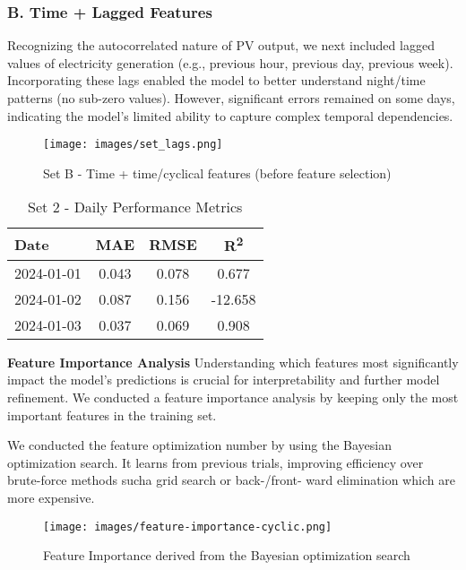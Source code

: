 \subsubsection*{B. Time + Lagged Features}
Recognizing the autocorrelated nature of PV output, we next included lagged values of 
electricity generation (e.g., previous hour, previous day, previous week). Incorporating 
these lags enabled the model to better understand night/time patterns (no sub-zero values).
However, significant errors remained on some days, indicating the model's limited ability 
to capture complex temporal dependencies.

\begin{figure}[H]
    \centering
    \texttt{[image: images/set\_lags.png]}
    \caption{Set B - Time + time/cyclical features (before feature selection)}
\end{figure}

\begin{table}[H]
    \centering
    \begin{tabular}{lccc}
        Date        & MAE    & RMSE   & R\textsuperscript{2} \\
        \hline
        2024-01-01  & 0.043  & 0.078  & 0.677 \\
        2024-01-02  & 0.087  & 0.156  & -12.658 \\
        2024-01-03  & 0.037  & 0.069  & 0.908 \\
    \end{tabular}
    \caption{Set 2 - Daily Performance Metrics}
\end{table}

\textbf{Feature Importance Analysis} Understanding which features 
most significantly impact the model's predictions is crucial for 
interpretability and further model refinement. We conducted a feature 
importance analysis by keeping only the most important features in the 
training set.

We conducted  the feature optimization number by using the Bayesian optimization search.
It learns from previous trials, improving efficiency over brute-force methods sucha grid 
search or back-/front- ward elimination which are more expensive.

\begin{figure}[h!]
    \centering
    \texttt{[image: images/feature-importance-cyclic.png]}
    \caption{Feature Importance derived from the Bayesian optimization search}
    \label{fig:feature-importance}
\end{figure}

